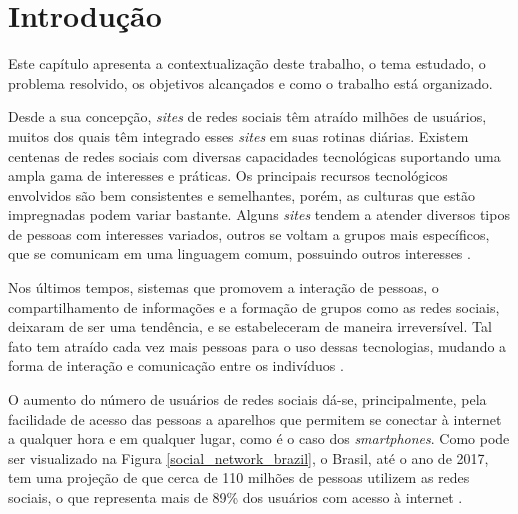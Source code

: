 \chapter*[Introdução]{Introdução}

Este capítulo apresenta a contextualização deste trabalho, o tema estudado, o problema resolvido, os objetivos alcançados e como o trabalho está organizado.

Desde a sua concepção, \textit{sites} de redes sociais têm atraído milhões de usuários, muitos dos quais têm integrado esses \textit{sites} em suas rotinas diárias. Existem centenas de redes sociais com diversas capacidades tecnológicas suportando uma ampla gama de interesses e práticas. Os principais recursos tecnológicos envolvidos são bem consistentes e semelhantes, porém, as culturas que estão impregnadas podem variar bastante. Alguns \textit{sites} tendem a atender diversos tipos de pessoas com interesses variados, outros se voltam a grupos mais específicos, que se comunicam em uma linguagem comum, possuindo outros interesses \cite{Boyd:Ellison:2007}.

Nos últimos tempos, sistemas que promovem a interação de pessoas, o compartilhamento de informações e a formação de grupos como as redes sociais, deixaram de ser uma tendência, e se estabeleceram de maneira irreversível. Tal fato tem atraído cada vez mais pessoas para o uso dessas tecnologias, mudando a forma de interação e comunicação entre os indivíduos \cite{Santana:Melo-Solarte:Neris:Miranda:Baranauskas:2009}.

O aumento do número de usuários de redes sociais dá-se, principalmente, pela facilidade de acesso das pessoas a aparelhos que permitem se conectar à internet a qualquer hora e em qualquer lugar, como é o caso dos \textit{smartphones}. Como pode ser visualizado na Figura \ref{social_network_brazil}, o Brasil, até o ano de 2017, tem uma projeção de que cerca de 110 milhões de pessoas utilizem as redes sociais, o que representa mais de 89\% dos usuários com acesso à internet \cite{eMarketer:2013}.

\newpage

